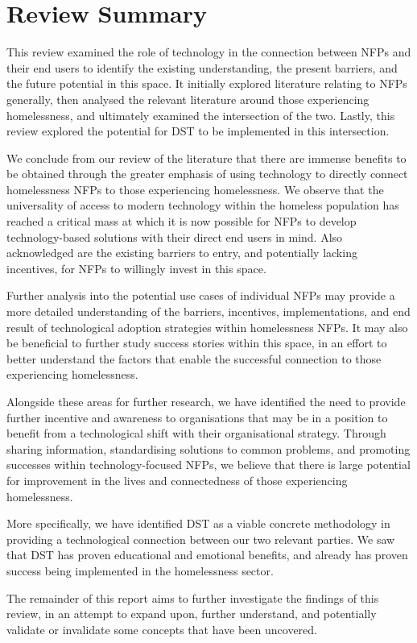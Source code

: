 \section{Review Summary}

This review examined the role of technology in the connection between NFPs and their end users to identify the existing understanding, the present barriers, and the future potential in this space. It initially explored literature relating to NFPs generally, then analysed the relevant literature around those experiencing homelessness, and ultimately examined the intersection of the two. Lastly, this review explored the potential for DST to be implemented in this intersection.

We conclude from our review of the literature that there are immense benefits to be obtained through the greater emphasis of using technology to directly connect homelessness NFPs to those experiencing homelessness. We observe that the universality of access to modern technology within the homeless population has reached a critical mass at which it is now possible for NFPs to develop technology-based solutions with their direct end users in mind. Also acknowledged are the existing barriers to entry, and potentially lacking incentives, for NFPs to willingly invest in this space.

Further analysis into the potential use cases of individual NFPs may provide a more detailed understanding of the barriers, incentives, implementations, and end result of technological adoption strategies within homelessness NFPs. It may also be beneficial to further study success stories within this space, in an effort to better understand the factors that enable the successful connection to those experiencing homelessness.

Alongside these areas for further research, we have identified the need to provide further incentive and awareness to organisations that may be in a position to benefit from a technological shift with their organisational strategy. Through sharing information, standardising solutions to common problems, and promoting successes within technology-focused NFPs, we believe that there is large potential for improvement in the lives and connectedness of those experiencing homelessness.

More specifically, we have identified DST as a viable concrete methodology in providing a technological connection between our two relevant parties. We saw that DST has proven educational and emotional benefits, and already has proven success being implemented in the homelessness sector.

The remainder of this report aims to further investigate the findings of this review, in an attempt to expand upon, further understand, and potentially validate or invalidate some concepts that have been uncovered.